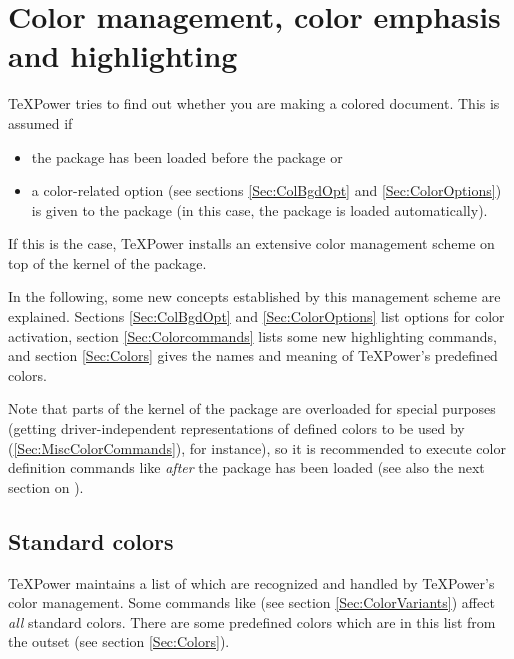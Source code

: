 \documentclass[12pt]{scrartcl}
\let\newslide=\relax
\begin{document}
  \section{Color management, color emphasis and highlighting}\label{Sec:ColorEmphasis}
  \TeX Power tries to find out whether you are making a colored document. This is assumed if
  \begin{itemize}
  \item the \href{ftp://ftp.dante.de/tex-archive/help/Catalogue/entries/color.html}{} package has been
    loaded before the  package or
  \item a color-related option (see sections \ref{Sec:ColBgdOpt} and \ref{Sec:ColorOptions}) is given to the
     package (in this case, the
    \href{ftp://ftp.dante.de/tex-archive/help/Catalogue/entries/color.html}{} package is loaded
    automatically).
  \end{itemize}
  If this is the case, \TeX Power installs an extensive color management scheme on top of the kernel of the
  \href{ftp://ftp.dante.de/tex-archive/help/Catalogue/entries/color.html}{} package.

  In the following, some new concepts established by this management scheme are explained. Sections \ref{Sec:ColBgdOpt}
  and \ref{Sec:ColorOptions} list options for color activation, section \ref{Sec:Colorcommands} lists some new
  highlighting commands, and section \ref{Sec:Colors} gives the names and meaning of \TeX Power's predefined colors.

  Note that parts of the kernel of the
  \href{ftp://ftp.dante.de/tex-archive/help/Catalogue/entries/color.html}{} package are overloaded for
  special purposes (getting driver-independent representations of defined colors to be used by 
  (\ref{Sec:MiscColorCommands}), for instance), so it is recommended to execute color definition commands like
   \emph{after} the  package has been loaded (see also the next section on
  ).

  \newslide

  \subsection{Standard colors}\label{Sec:StdCols}
  \TeX Power maintains a list of  which are recognized and handled by \TeX Power's color
  management. Some commands like  (see section \ref{Sec:ColorVariants}) affect \emph{all} standard
  colors. There are some predefined colors which are in this list from the outset (see section \ref{Sec:Colors}).
\end{document}
